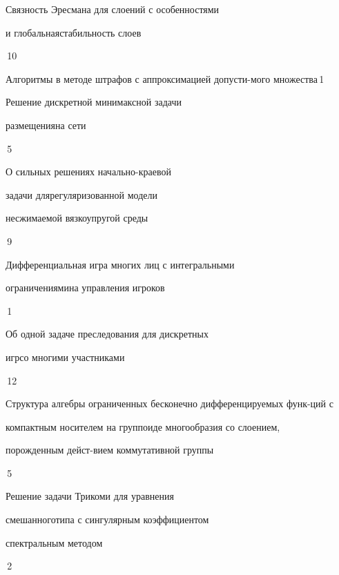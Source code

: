 {Связность Эресмана для слоений с особенностями


и глобальная\newline стабильность слоев}{\No\,10}







{Алгоритмы в методе штрафов с аппроксимацией допусти-\newline мого множества}{\No\,1}




{Решение дискретной минимаксной задачи


размещения\newline на сети}{\No\,5}




{О сильных решениях начально-краевой


задачи для\newline регуляризованной модели


несжимаемой вязкоупругой среды}{\No\,9}










{Дифференциальная игра многих лиц с интегральными


ограничениями\newline на управления игроков}{\No\,1}




{Об одной задаче преследования для дискретных


игр\newline со многими участниками}{\No\,12}




{Структура алгебры ограниченных бесконечно дифференцируемых функ-\newline ций с


компактным носителем на группоиде многообразия со слоением,


порожденным дейст-\newline вием коммутативной группы}{\No\,5}




{Решение задачи Трикоми для уравнения


смешанного\newline типа с сингулярным коэффициентом


спектральным методом}{\No\,2}








